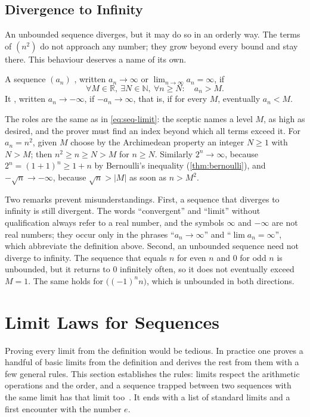 \subsection{Divergence to Infinity}

An unbounded sequence diverges, but it may do so in an orderly way. The terms of $(n^2)$ do not approach any number; they grow beyond every bound and stay there. This behaviour deserves a name of its own.

\begin{definition}
\label{def:diverge-infinity}
A sequence $(a_n)$ , written $a_n\to\infty$ or $\lim_{n\to\infty}a_n=\infty$, if
\[
\forall M\in\mathbb R,\ \exists N\in\mathbb N,\ \forall n\ge N:\quad a_n>M .
\]
It , written $a_n\to-\infty$, if $-a_n\to\infty$, that is, if for every $M$, eventually $a_n<M$.
\end{definition}

The roles are the same as in \eqref{eq:seq-limit}: the sceptic names a level $M$, as high as desired, and the prover must find an index beyond which all terms exceed it. For $a_n=n^2$, given $M$ choose by the Archimedean property an integer $N\ge1$ with $N>M$; then $n^2\ge n\ge N>M$ for $n\ge N$. Similarly $2^n\to\infty$, because $2^n=(1+1)^n\ge1+n$ by Bernoulli's inequality (\cref{thm:bernoulli}), and $-\sqrt n\to-\infty$, because $\sqrt n>|M|$ as soon as $n>M^2$.

Two remarks prevent misunderstandings. First, a sequence that diverges to infinity is still divergent. The words ``convergent'' and ``limit'' without qualification always refer to a real number, and the symbols $\infty$ and $-\infty$ are not real numbers; they occur only in the phrases ``$a_n\to\infty$'' and ``$\lim a_n=\infty$'', which abbreviate the definition above. Second, an unbounded sequence need not diverge to infinity. The sequence that equals $n$ for even $n$ and $0$ for odd $n$ is unbounded, but it returns to $0$ infinitely often, so it does not eventually exceed $M=1$. The same holds for $\bigl((-1)^nn\bigr)$, which is unbounded in both directions.

\section{Limit Laws for Sequences}
\label{sec:limit-laws}

Proving every limit from the definition would be tedious. In practice one proves a handful of basic limits from the definition and derives the rest from them with a few general rules. This section establishes the rules: limits respect the arithmetic operations and the order, and a sequence trapped between two sequences with the same limit has that limit too~\cite{spivak2008calculus,abbott2015}. It ends with a list of standard limits and a first encounter with the number $e$.

